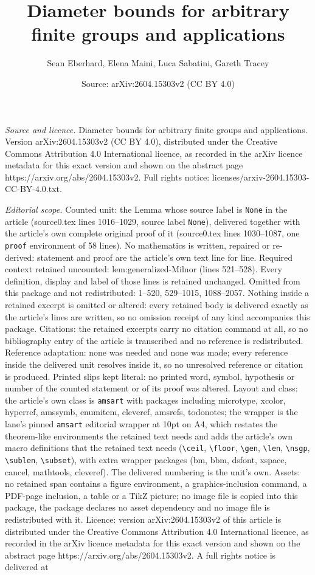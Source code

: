 \documentclass[10pt,a4paper]{amsart}
\title[Diameter bounds for arbitrary finite groups and applications]{Diameter bounds for arbitrary finite groups and applications}
\author{Sean Eberhard, Elena Maini, Luca Sabatini, Gareth Tracey}
\date{Source: arXiv:2604.15303v2 (CC BY 4.0)}
\begin{document}
\maketitle

\noindent\emph{Source and licence.} Diameter bounds for arbitrary finite groups and applications. Version arXiv:2604.15303v2 (CC BY 4.0), distributed under the Creative Commons Attribution 4.0 International licence, as recorded in the arXiv licence metadata for this exact version and shown on the abstract page https://arxiv.org/abs/2604.15303v2. Full rights notice: licenses/arxiv-2604.15303-CC-BY-4.0.txt.\par\smallskip

\noindent\textit{Editorial scope.} Counted unit: the Lemma whose source label is \texttt{None} in the article (source0.tex lines 1016--1029, source label \texttt{None}), delivered together with the article's own complete original proof of it (source0.tex lines 1030--1087, one \texttt{proof} environment of 58 lines). No mathematics is written, repaired or re-derived: statement and proof are the article's own text line for line. Required context retained uncounted: lem:generalized-Milnor (lines 521--528). Every definition, display and label of those lines is retained unchanged. Omitted from this package and not redistributed: 1--520, 529--1015, 1088--2057. Nothing inside a retained excerpt is omitted or altered: every retained body is delivered exactly as the article's lines are written, so no omission receipt of any kind accompanies this package. Citations: the retained excerpts carry no citation command at all, so no bibliography entry of the article is transcribed and no reference is redistributed. Reference adaptation: none was needed and none was made; every reference inside the delivered unit resolves inside it, so no unresolved reference or citation is produced. Printed slips kept literal: no printed word, symbol, hypothesis or number of the counted statement or of its proof was altered. Layout and class: the article's own class is \texttt{amsart} with packages including microtype, xcolor, hyperref, amssymb, enumitem, cleveref, amsrefs, todonotes; the wrapper is the lane's pinned \texttt{amsart} editorial wrapper at 10pt on A4, which restates the theorem-like environments the retained text needs and adds the article's own macro definitions that the retained text needs (\texttt{\textbackslash ceil}, \texttt{\textbackslash floor}, \texttt{\textbackslash gen}, \texttt{\textbackslash len}, \texttt{\textbackslash nsgp}, \texttt{\textbackslash sublen}, \texttt{\textbackslash subset}), with extra wrapper packages (bm, bbm, dsfont, xspace, cancel, mathtools, cleveref). The delivered numbering is the unit's own. Assets: no retained span contains a figure environment, a graphics-inclusion command, a PDF-page inclusion, a table or a TikZ picture; no image file is copied into this package, the package declares no asset dependency and no image file is redistributed with it. Licence: version arXiv:2604.15303v2 of this article is distributed under the Creative Commons Attribution 4.0 International licence, as recorded in the arXiv licence metadata for this exact version and shown on the abstract page https://arxiv.org/abs/2604.15303v2. A full rights notice is delivered at 
\end{document}
